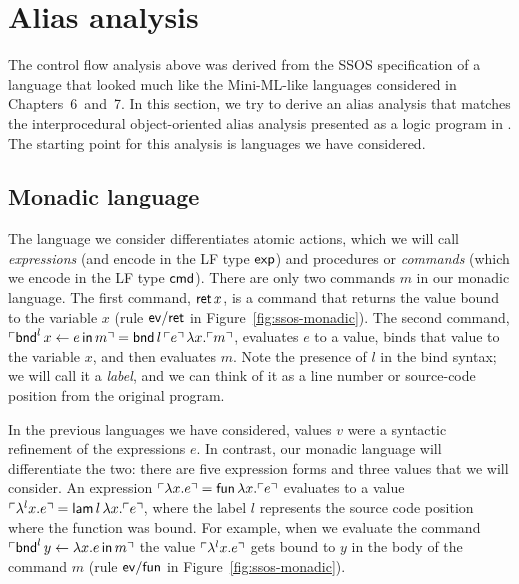\section{Alias analysis}

The control flow analysis above was derived from the SSOS
specification of a language that looked much like the Mini-ML-like
languages considered in Chapters~6~and~7.  In this section, we try to
derive an alias analysis that matches the interprocedural
object-oriented alias analysis presented as a logic program in
\cite[Chapter 12.4]{aho07compilers}.  The starting point for this
analysis is  languages we have considered.

\subsection{Monadic language}

The language we consider differentiates atomic actions, which we will
call {\it expressions} (and encode in the LF type ${\sf exp}$) and
procedures or {\it commands} (which we encode in the LF type ${\sf
  cmd}$). There are only two commands $m$ in our monadic language. The
first command, ${\sf ret}\,x$, is a command that returns the value
bound to the variable $x$ (rule ${\sf ev/ret}$ in
Figure~\ref{fig:ssos-monadic}). The second command, ${\ulcorner{{\sf
    bnd}^l\, x \leftarrow e \,{\sf in}\,m}\urcorner} = {\sf
  bnd}\,l\,{\ulcorner{e}\urcorner}\,\lambda x.{\ulcorner{m}\urcorner}$, evaluates $e$ to a
value, binds that value to the variable $x$, and then evaluates
$m$. Note the presence of $l$ in the bind syntax; we will call it a
{\it label}, and we can think of it as a line number or source-code
position from the original program.

In the previous languages we have considered, values $v$ were a
syntactic refinement of the expressions $e$. In contrast, our monadic
language will differentiate the two: there are five expression forms
and three values that we will consider. An expression ${\ulcorner{\lambda
  x.e}\urcorner} = {\sf fun}\,\lambda x.{\ulcorner{e}\urcorner}$ evaluates to a value
${\ulcorner{\lambda^l x.e}\urcorner} = {\sf lam}\,l\,\lambda x.{\ulcorner{e}\urcorner}$, where
the label $l$ represents the source code position where the function
was bound. For example, when we evaluate the command ${\ulcorner{{\sf
    bnd}^l \, y \leftarrow \lambda x.e \,{\sf in}\,m}\urcorner}$ the value
${\ulcorner{\lambda^l x.e}\urcorner}$ gets bound to $y$ in the body of the command
$m$ (rule ${\sf ev/fun}$ in Figure~\ref{fig:ssos-monadic}).

